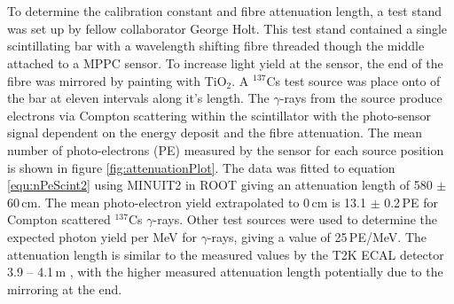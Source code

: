\\\\To determine the calibration constant and fibre attenuation length, a test stand was set up by fellow collaborator George Holt. This test stand contained a single scintillating bar with a wavelength shifting fibre threaded though the middle attached to a MPPC sensor. To increase light yield at the sensor, the end of the fibre was mirrored by painting with TiO$_2$. A $^{137}$Cs test source was place onto of the bar at eleven intervals along it's length. The $\gamma$-rays from the source produce electrons via Compton scattering within the scintillator with the photo-sensor signal dependent on the energy deposit and the fibre attenuation. The mean number of photo-electrons (PE) measured by the sensor for each source position is shown in figure \ref{fig:attenuationPlot}. The data was fitted to equation \ref{equ:nPeScint2} using MINUIT2 in ROOT\cite{ROOT_Brun_1997} giving an attenuation length of 580 $\pm$ 60\,cm. The mean photo-electron  yield extrapolated to 0\,cm is 13.1 $\pm$ 0.2\,PE for Compton scattered $^{137}$Cs $\gamma$-rays. Other test sources were used to determine the expected photon yield per MeV for $\gamma$-rays, giving a value of 25\,PE/MeV. The attenuation length is similar to the measured values by the T2K ECAL detector 3.9 -- 4.1\,m \cite{Allan_2013}, with the higher measured attenuation length potentially due to the mirroring at the end.


